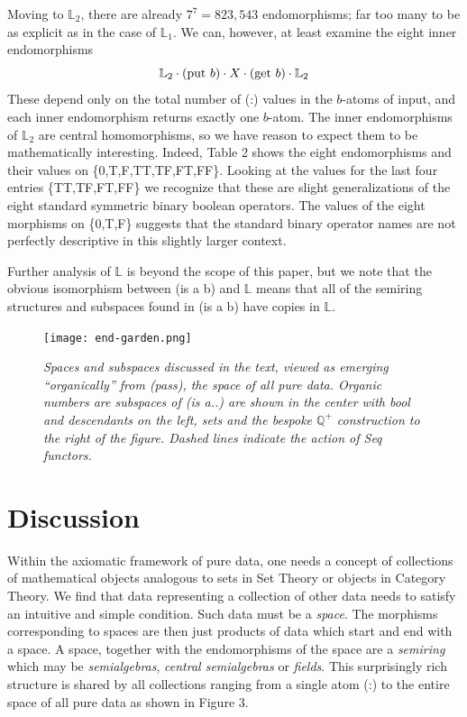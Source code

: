 \documentclass[11pt]{article}
\begin{document}
    Moving to ${\mathbb L}_2$, there are already $7^7=823,543$ endomorphisms; far too many to be as explicit as in the case of ${\mathbb L}_1$.  
 We can, however, at least examine the eight inner endomorphisms 
 \begin{equation}
 {\mathbb L}_2\cdot ({\rm put}\ b)\cdot X \cdot ({\rm get}\ b) \cdot {\mathbb L}_2
 \end{equation}
These depend only on the total number of (:) values in the $b$-atoms of input, and each 
inner endomorphism returns exactly one $b$-atom.  
The inner endomorphisms of ${\mathbb L}_2$ are central homomorphisms, so we have reason to expect them to be
mathematically interesting.   
Indeed, Table 2 shows the eight endomorphisms and their values on \{0,T,F,TT,TF,FT,FF\}.  Looking at the values for the last four entries \{TT,TF,FT,FF\} 
we recognize that these are slight generalizations of the eight standard symmetric binary boolean operators.  The values of the eight morphisms 
on \{0,T,F\} suggests that the standard binary operator names are not perfectly descriptive in this slightly larger context.  

    Further analysis of ${\mathbb L}$ is beyond the scope of this paper, but we note that the obvious isomorphism between (is a b) and ${\mathbb L}$ 
means that all of the semiring structures and subspaces found in (is a b) have copies in ${\mathbb L}$.  

\begin{figure}[h]
\centering
\texttt{[image: end-garden.png]}
\caption{{\it Spaces and subspaces discussed in the text, viewed as emerging ``organically'' from (pass), the space of all pure data. 
Organic numbers are subspaces of (is a..) are shown in the center with bool and descendants on the left, sets and the bespoke
${\mathbb Q}^+$ construction to the right of the figure.  Dashed lines indicate the action of Seq functors.}}
\end{figure}

\section{Discussion} 

      Within the axiomatic framework of pure data, one needs a concept of collections of mathematical objects analogous to sets in Set Theory or objects  
in Category Theory.   We find that data representing a collection of other data needs to satisfy an intuitive and simple condition.  Such data must 
be a {\it space}.  The morphisms corresponding to spaces are then just products of data which start and end with a space.  
A space, together with the endomorphisms of the space are a {\it semiring} which may be {\it semialgebras}, {\it central semialgebras} or 
{\it fields}.  This surprisingly rich structure is shared by all collections ranging from a single atom (:) to the entire space of all pure data as shown 
in Figure 3.  
\end{document}

